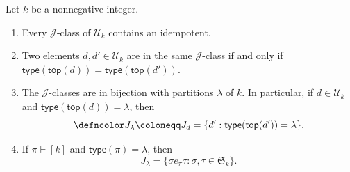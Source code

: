 \begin{prop}\label{prop:charJclass}
Let $k$ be a nonnegative integer. 
\begin{enumerate}[label=(\alph*)]
    \item \label{35a}Every $\mathscr{J}$-class of $\mathcal{U}_k$ contains an idempotent. 
    \item\label{35b} Two elements $d, d' \in \mathcal{U}_k$ are in the same $\mathscr{J}$-class if and only if $\mathsf{type}(\mathsf{top}(d)) = \mathsf{type}(\mathsf{top}(d'))$.
    \item\label{35c} The $\mathscr{J}$-classes are in bijection with partitions $\lambda$ of $k$. In particular, if $d\in \mathcal{U}_k$ and 
    $\mathsf{type}(\mathsf{top}(d)) = \lambda$, then 
    \[ {\defncolor J_\lambda} \coloneqq J_d = \{ d' : \mathsf{type}(\mathsf{top}(d')) = \lambda\}. \]
    \item\label{35d} If $\pi\vdash [k]$ and $\mathsf{type}(\pi) = \lambda$, then 
    \[ J_{\lambda} = \{\sigma e_\pi \tau : \sigma, \tau\in \mathfrak{S}_k\}.\]
\end{enumerate}
\end{prop}

